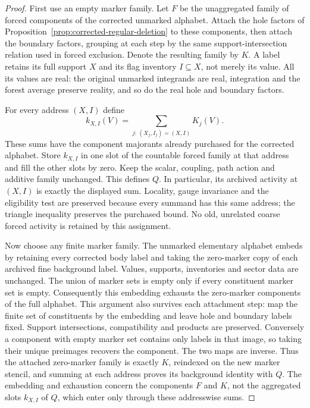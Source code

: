 \begin{proof}
First use an empty marker family. Let $F$ be the unaggregated family of
forced components of the corrected unmarked alphabet. Attach the hole factors of
Proposition~\ref{prop:corrected-regular-deletion} to these components,
then attach the boundary factors, grouping at each step by the same
support-intersection relation used in forced exclusion. Denote the
resulting family by $K$. A label retains its full support $X$ and its
flag inventory $I\subseteq X$, not merely its value. All its values
are real: the original unmarked integrands are real, integration and
the forest average preserve reality, and so do the real hole and
boundary factors.

For every address $(X,I)$ define
\[
 k_{X,I}(V)=\sum_{j:\,(X_j,I_j)=(X,I)}K_j(V).
\]
These sums have the component majorants already purchased for the
corrected alphabet. Store $k_{X,I}$ in one slot of the countable
forced family at that address and fill the other slots by zero.
Keep the scalar, coupling, path action and additive family unchanged.
This defines $Q$. In particular, its archived activity at $(X,I)$
is exactly the displayed sum. Locality, gauge invariance and the
eligibility test are preserved because every summand has this same
address; the triangle inequality preserves the purchased bound.
No old, unrelated coarse forced activity is retained by this assignment.

Now choose any finite marker family. The unmarked elementary alphabet
embeds by retaining every corrected body label and taking the
zero-marker copy of each archived fine background label. Values,
supports, inventories and sector data are unchanged. The union of
marker sets is empty only if every constituent marker set is empty.
Consequently this embedding exhausts the zero-marker components of
the full alphabet. This argument also survives each attachment step:
map the finite set of constituents by the embedding and leave hole
and boundary labels fixed. Support intersections, compatibility and
products are preserved. Conversely a component with empty marker set
contains only labels in that image, so taking their unique preimages
recovers the component. The two maps are inverse. Thus the attached
zero-marker family is exactly $K$, reindexed on the new marker stencil,
and summing at each address proves its background identity with $Q$.
The embedding and exhaustion concern the components $F$ and $K$, not
the aggregated slots $k_{X,I}$ of $Q$, which enter only through these
addresswise sums.


\end{proof}
